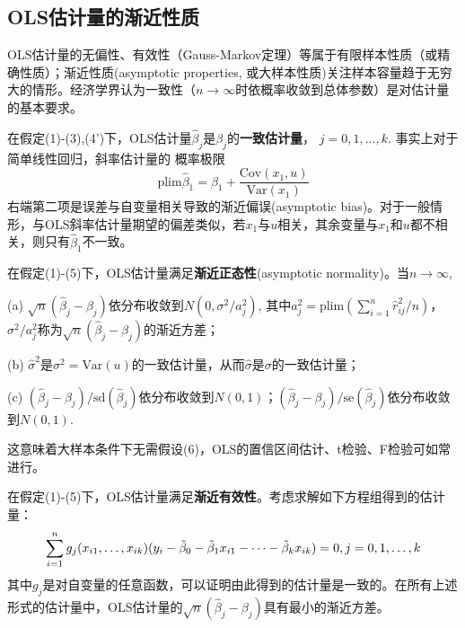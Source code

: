\subsection{OLS估计量的渐近性质}

\par OLS估计量的无偏性、有效性（Gauss-Markov定理）等属于有限样本性质（或精确性质）；渐近性质(asymptotic properties, 或大样本性质)关注样本容量趋于无穷大的情形。经济学界认为一致性（$n\to \infty$时依概率收敛到总体参数）是对估计量的基本要求。

\par 在假定(1)-(3),(4')下，OLS估计量$\hat{\beta}_j$是${\beta}_j$的\textbf{一致估计量}， $j=0,1,\dots,k$. 事实上对于简单线性回归，斜率估计量的
概率极限\begin{equation}
    \text{plim}\hat{\beta}_1=\beta_1+\frac{\text{Cov}(x_1,u)}{\text{Var}(x_1)}
\end{equation}
右端第二项是误差与自变量相关导致的渐近偏误(asymptotic bias)。对于一般情形，与OLS斜率估计量期望的偏差类似，若$x_1$与$u$相关，其余变量与$x_1$和$u$都不相关，则只有$\hat{\beta}_1$不一致。

\par 在假定(1)-(5)下，OLS估计量满足\textbf{渐近正态性}(asymptotic normality)。当$n \to \infty$,
\par (a) $\sqrt{n}(\hat{\beta}_j-\beta_j)$依分布收敛到$N(0,\sigma^2/a_j^2)$, 其中$a_j^2=\text{plim}(\sum_{i=1}^n \hat{r}_{ij}^2/n)$，$\sigma^2/a_j^2$称为$\sqrt{n}(\hat{\beta}_j-\beta_j)$的渐近方差；
\par (b) $\hat{\sigma}^2$是$\sigma^2=\text{Var}(u)$的一致估计量，从而$\hat{\sigma}$是$\sigma$的一致估计量；
\par (c) $(\hat{\beta}_j-\beta_j)/\text{sd}(\hat{\beta}_j)$依分布收敛到$N(0,1)$；$(\hat{\beta}_j-\beta_j)/\text{se}(\hat{\beta}_j)$依分布收敛到$N(0,1)$.
\par 这意味着大样本条件下无需假设(6)，OLS的置信区间估计、t检验、F检验可如常进行。

\par 在假定(1)-(5)下，OLS估计量满足\textbf{渐近有效性}。考虑求解如下方程组得到的估计量：
\begin{equation}
    \sum_{i=1}^n g_j(x_{i1},\dots,x_{ik})(y_i-\Tilde{\beta}_0-\Tilde{\beta}_1x_{i1}-\dots-\Tilde{\beta}_kx_{ik})=0, j=0,1,\dots,k
\end{equation}
其中$g_j$是对自变量的任意函数，可以证明由此得到的估计量是一致的。在所有上述形式的估计量中，OLS估计量的$\sqrt{n}(\hat{\beta}_j-\beta_j)$具有最小的渐近方差。


